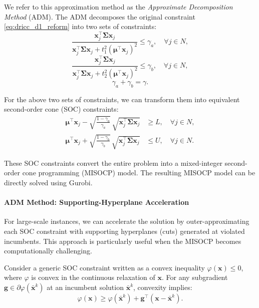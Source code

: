 \documentclass[preprint,12pt,authoryear]{elsarticle}
\begin{document}
We refer to this approximation method as the \textit{Approximate Decomposition Method} (ADM). The ADM decomposes the original constraint \eqref{eq:dricc_d1_reform} into two sets of constraints:
\begin{equation}
\frac{\mathbf{x}_j^\top \boldsymbol{\Sigma} \mathbf{x}_j}{\mathbf{x}_j^\top \boldsymbol{\Sigma} \mathbf{x}_j + t_1^2 (\boldsymbol{\mu}^\top \mathbf{x}_j)^2} \leqslant \gamma_a, \quad \forall j \in N, \label{eq:approx_constraint_1}
\end{equation}
\begin{equation}
\frac{\mathbf{x}_j^\top \boldsymbol{\Sigma} \mathbf{x}_j}{\mathbf{x}_j^\top \boldsymbol{\Sigma} \mathbf{x}_j + t_2^2 (\boldsymbol{\mu}^\top \mathbf{x}_j)^2} \leqslant \gamma_b, \quad \forall j \in N, \label{eq:approx_constraint_2}
\end{equation}
\begin{equation}
    \gamma_a + \gamma_b = \gamma.
\end{equation}

For the above two sets of constraints, we can transform them into equivalent second-order cone (SOC) constraints:
\begin{align}
\boldsymbol{\mu}^\top \mathbf{x}_j - \sqrt{\frac{1 - \gamma_a}{\gamma_a}} \, \sqrt{\mathbf{x}_j^\top \boldsymbol{\Sigma} \mathbf{x}_j} &\geqslant L, \quad \forall j \in N, \label{eq:dricc_d1_reform_lower} \\
\boldsymbol{\mu}^\top \mathbf{x}_j + \sqrt{\frac{1 - \gamma_b}{\gamma_b}} \, \sqrt{\mathbf{x}_j^\top \boldsymbol{\Sigma} \mathbf{x}_j} &\leqslant U, \quad \forall j \in N. \label{eq:dricc_d1_reform_upper}
\end{align}

These SOC constraints convert the entire problem into a mixed-integer second-order cone programming (MISOCP) model. The resulting MISOCP model can be directly solved using Gurobi.

\paragraph{ADM Method: Supporting-Hyperplane Acceleration}
For large-scale instances, we can accelerate the solution by outer-approximating each SOC constraint with supporting hyperplanes (cuts) generated at violated incumbents. This approach is particularly useful when the MISOCP becomes computationally challenging.

Consider a generic SOC constraint written as a convex inequality $\varphi(\mathbf{x}) \leqslant 0$, where $\varphi$ is convex in the continuous relaxation of $\mathbf{x}$. For any subgradient $\mathbf{g} \in \partial \varphi(\bar{\mathbf{x}}^k)$ at an incumbent solution $\bar{\mathbf{x}}^k$, convexity implies:
\begin{equation}
\varphi(\mathbf{x}) \geqslant \varphi(\bar{\mathbf{x}}^k) + \mathbf{g}^\top (\mathbf{x} - \bar{\mathbf{x}}^k).
\end{equation}
\end{document}
